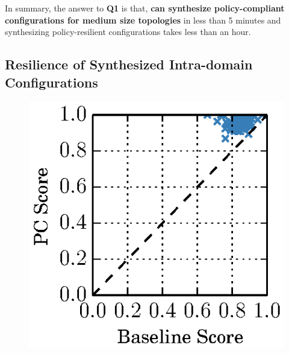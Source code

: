 In summary, the answer to \textbf{Q1} is that,
\textbf{\name can synthesize policy-compliant configurations for medium size
topologies} in less than 5 minutes and synthesizing policy-resilient 
configurations takes less than an hour.


\subsection{Resilience of Synthesized Intra-domain Configurations} \label{sec:reseval}

\begin{figure}
	\begin{center}
	\vspace{-10mm}
		\includegraphics[width=0.20\columnwidth]{figures/ospfbaselineresilience.eps}
	\end{center} 
\end{figure}
